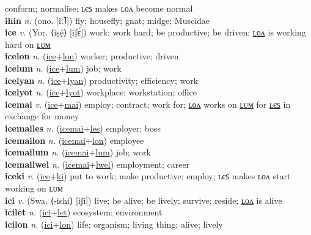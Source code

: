conform; normalise; ʟєꜱ makes ʟᴏᴧ become normal \label{ihohaki} \\
\textbf{ihin} \textit{n.} (ono. [ĩː˥])
fly; housefly; gnat; midge; Muscidae \label{ihin} \\
\textbf{ice} \textit{v.} (Yor. ⟨iṣẹ́⟩ [īʃɛ́])
work; work hard; be productive; be driven; \hyperref[icelon]{ʟᴏᴧ} is working hard on \hyperref[icelum]{ʟᴜᴍ} \label{ice} \\
\textbf{icelon} \textit{n.} (\hyperref[ice]{ice}+\hyperref[lon]{lon})
worker; productive; driven \label{icelon} \\
\textbf{icelum} \textit{n.} (\hyperref[ice]{ice}+\hyperref[lum]{lum})
job; work \label{icelum} \\
\textbf{icelyan} \textit{n.} (\hyperref[ice]{ice}+\hyperref[lyan]{lyan})
productivity; efficiency; work \label{icelyan} \\
\textbf{icelyot} \textit{n.} (\hyperref[ice]{ice}+\hyperref[lyot]{lyot})
workplace; workstation; office \label{icelyot} \\
\textbf{icemai} \textit{v.} (\hyperref[ice]{ice}+\hyperref[mai]{mai})
employ; contract; work for; \hyperref[icemailon]{ʟᴏᴧ} works on \hyperref[icemailum]{ʟᴜᴍ} for \hyperref[icemailes]{ʟєꜱ} in exchange for money \label{icemai} \\
\textbf{icemailes} \textit{n.} (\hyperref[icemai]{icemai}+\hyperref[les]{les})
employer; boss \label{icemailes} \\
\textbf{icemailon} \textit{n.} (\hyperref[icemai]{icemai}+\hyperref[lon]{lon})
employee \label{icemailon} \\
\textbf{icemailum} \textit{n.} (\hyperref[icemai]{icemai}+\hyperref[lum]{lum})
job; work \label{icemailum} \\
\textbf{icemailwel} \textit{n.} (\hyperref[icemai]{icemai}+\hyperref[lwel]{lwel})
employment; career \label{icemailwel} \\
\textbf{iceki} \textit{v.} (\hyperref[ice]{ice}+\hyperref[ki]{ki})
put to work; make productive; employ; ʟєꜱ makes ʟᴏᴧ start working on ʟᴜᴍ \label{iceki} \\
\textbf{ici} \textit{v.} (Swa. ⟨-ishi⟩ [iʃi])
live; be alive; be lively; survive; reside; \hyperref[icilon]{ʟᴏᴧ} is alive \label{ici} \\
\textbf{icilet} \textit{n.} (\hyperref[ici]{ici}+\hyperref[let]{let})
ecosystem; environment \label{icilet} \\
\textbf{icilon} \textit{n.} (\hyperref[ici]{ici}+\hyperref[lon]{lon})
life; organism; living thing; alive; lively \label{icilon} \\

